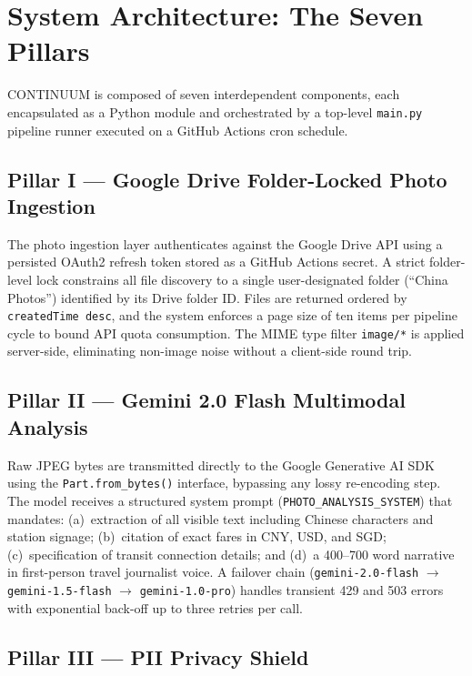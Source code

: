\documentclass[conference]{IEEEtran}
\begin{document}
\section{System Architecture: The Seven Pillars}
\label{sec:arch}

\textsc{CONTINUUM} is composed of seven interdependent components, each
encapsulated as a Python module and orchestrated by a top-level \texttt{main.py}
pipeline runner executed on a GitHub Actions cron schedule.

\subsection{Pillar I — Google Drive Folder-Locked Photo Ingestion}

The photo ingestion layer authenticates against the Google Drive API using a
persisted OAuth2 refresh token stored as a GitHub Actions secret. A
strict folder-level lock constrains all file discovery to a single user-designated
folder (``China Photos'') identified by its Drive folder ID. Files are returned
ordered by \texttt{createdTime~desc}, and the system enforces a page size of ten
items per pipeline cycle to bound API quota consumption. The MIME type filter
\texttt{image/*} is applied server-side, eliminating non-image noise without a
client-side round trip.

\subsection{Pillar II — Gemini 2.0 Flash Multimodal Analysis}

Raw JPEG bytes are transmitted directly to the Google Generative AI SDK using the
\texttt{Part.from\_bytes()} interface, bypassing any lossy re-encoding step.
The model receives a structured system prompt (\texttt{PHOTO\_ANALYSIS\_SYSTEM})
that mandates: (a)~extraction of all visible text including Chinese characters and
station signage; (b)~citation of exact fares in CNY, USD, and SGD;
(c)~specification of transit connection details; and (d)~a 400--700 word
narrative in first-person travel journalist voice. A failover chain
(\texttt{gemini-2.0-flash} $\rightarrow$ \texttt{gemini-1.5-flash} $\rightarrow$
\texttt{gemini-1.0-pro}) handles transient 429 and 503 errors with exponential
back-off up to three retries per call.

\subsection{Pillar III — PII Privacy Shield}
\end{document}
